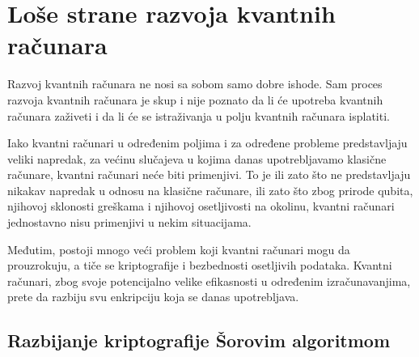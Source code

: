 \documentclass[fleqn, 12pt]{article}
\begin{document}
\newpage

\section{Loše strane razvoja kvantnih računara}

\begin{text}
Razvoj kvantnih računara ne nosi sa sobom samo dobre ishode. Sam proces razvoja kvantnih računara je skup i nije poznato da li će upotreba kvantnih računara zaživeti i da li će se istraživanja u polju kvantnih računara isplatiti.

Iako kvantni računari u određenim poljima i za određene probleme predstavljaju veliki napredak, za većinu slučajeva u kojima danas upotrebljavamo klasične računare, kvantni računari neće biti primenjivi. To je ili zato što ne predstavljaju nikakav napredak u odnosu na klasične računare, ili zato što zbog prirode qubita, njihovoj sklonosti greškama i njihovoj osetljivosti na okolinu, kvantni računari jednostavno nisu primenjivi u nekim situacijama.

Međutim, postoji mnogo veći problem koji kvantni računari mogu da prouzrokuju, a tiče se kriptografije i bezbednosti osetljivih podataka. Kvantni računari, zbog svoje potencijalno velike efikasnosti u određenim izračunavanjima, prete da razbiju svu enkripciju koja se danas upotrebljava.
\end{text}

\subsection{Razbijanje kriptografije Šorovim algoritmom}
\end{document}
